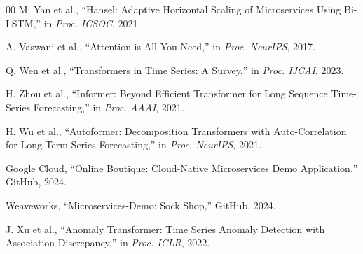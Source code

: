 \documentclass[conference]{IEEEtran}
\begin{document}
\begin{thebibliography}{00}
 M. Yan et al., ``Hansel: Adaptive Horizontal Scaling of Microservices Using Bi-LSTM,'' in \textit{Proc. ICSOC}, 2021.

 A. Vaswani et al., ``Attention is All You Need,'' in \textit{Proc. NeurIPS}, 2017.

 Q. Wen et al., ``Transformers in Time Series: A Survey,'' in \textit{Proc. IJCAI}, 2023.

 H. Zhou et al., ``Informer: Beyond Efficient Transformer for Long Sequence Time-Series Forecasting,'' in \textit{Proc. AAAI}, 2021.

 H. Wu et al., ``Autoformer: Decomposition Transformers with Auto-Correlation for Long-Term Series Forecasting,'' in \textit{Proc. NeurIPS}, 2021.

 Google Cloud, ``Online Boutique: Cloud-Native Microservices Demo Application,'' GitHub, 2024.

 Weaveworks, ``Microservices-Demo: Sock Shop,'' GitHub, 2024.

 J. Xu et al., ``Anomaly Transformer: Time Series Anomaly Detection with Association Discrepancy,'' in \textit{Proc. ICLR}, 2022.

\end{thebibliography}
\end{document}
